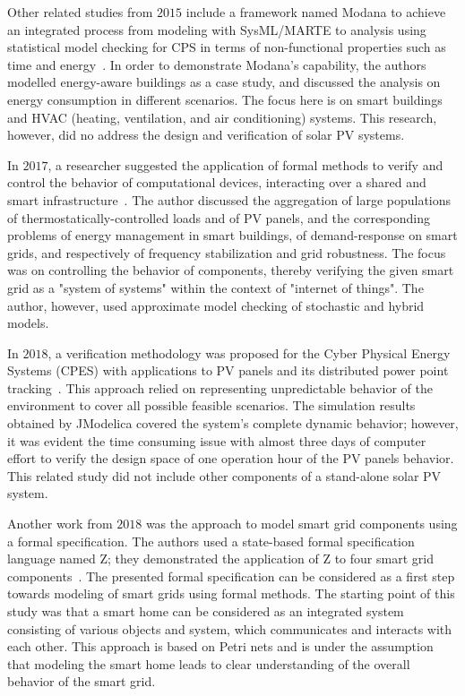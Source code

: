 \documentclass[review]{elsarticle}
\begin{document}
Other related studies from $2015$ include a framework named Modana to achieve an integrated process from modeling with SysML/MARTE to analysis using statistical model checking for CPS in terms of non-functional properties such as time and energy~\cite{Cheng2015}. In order to demonstrate Modana's capability, the authors modelled energy-aware buildings as a case study, and discussed the analysis on energy consumption in different scenarios. The focus here is on smart buildings and HVAC (heating, ventilation, and air conditioning) systems. This research, however, did no address the design and verification of solar PV systems. 
 
In $2017$, a researcher suggested the application of formal methods to verify and control the behavior of computational devices, interacting over a shared and smart infrastructure~\cite{Abate2017}. The author discussed the aggregation of large populations of thermostatically-controlled loads and of PV panels, and the corresponding problems of energy management in smart buildings, of demand-response on smart grids, and respectively of frequency stabilization and grid robustness. The focus was on controlling the behavior of components, thereby verifying the given smart grid as a "system of systems" within the context of "internet of things". The author, however, used approximate model checking of stochastic and hybrid models.

In $2018$, a verification methodology was proposed for the Cyber Physical Energy Systems (CPES) with applications to PV panels and its distributed power point tracking~\cite{Driouich2018}. This approach relied on representing unpredictable behavior of the environment to cover all possible feasible scenarios. The simulation results obtained by JModelica covered the system's complete dynamic behavior; however, it was evident the time consuming issue with almost three days of computer effort to verify the design space of one operation hour of the PV panels behavior. This related study did not include other components of a stand-alone solar PV system.

Another work from $2018$ was the approach to model smart grid components using a formal specification. The authors used a state-based formal specification language named Z; they demonstrated the application of Z to four smart grid components~\cite{Akram2018}. The presented formal specification can be considered as a first step towards modeling of smart grids using formal methods. The starting point of this study was that a smart home can be considered as an integrated system consisting of various objects and system, which communicates and interacts with each other. This approach is based on Petri nets and is under the assumption that modeling the smart home leads to clear understanding of the overall behavior of the smart grid.
\end{document}
